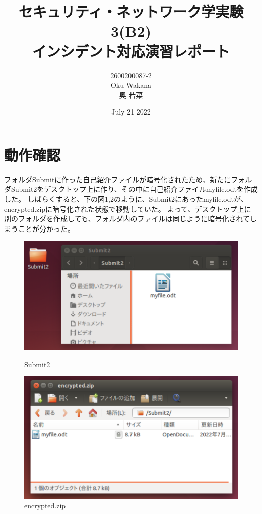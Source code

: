 \documentclass[dvipdfmx,autodetect-engine,titlepage]{jsarticle}
\title{セキュリティ・ネットワーク学実験3(B2)\\
インシデント対応演習レポート\\
}
\author{2600200087-2\\Oku Wakana\\奥 若菜}
\date{July 21 2022}
\begin{document}
\maketitle

\section{動作確認}
フォルダSubmitに作った自己紹介ファイルが暗号化されたため、新たにフォルダSubmit2をデスクトップ上に作り、その中に自己紹介ファイルmyfile.odtを作成した。
しばらくすると、下の図1,2のように、Submit2にあったmyfile.odtが、encrypted.zipに暗号化された状態で移動していた。
よって、デスクトップ上に別のフォルダを作成しても、フォルダ内のファイルは同じように暗号化されてしまうことが分かった。\\

\begin{figure}[H]
  \centering
  \begin{minipage}[b]{0.45\linewidth}
  \begin{center}
    \includegraphics[keepaspectratio,scale=0.46]{in1.png}
    \end{center}
    \caption{Submit2}
  \end{minipage}
  \begin{minipage}[b]{0.45\linewidth}
  \begin{center}
    \includegraphics[keepaspectratio,scale=0.44]{in2.png}
    \end{center}
    \caption{encrypted.zip}
  \end{minipage}
\end{figure}
\end{document}
